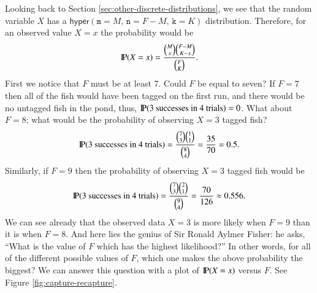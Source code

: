 \documentclass[captions=tableheading]{scrbook}
\begin{document}
\begin{example}
Looking back to Section \ref{sec:other-discrete-distributions}, we see that the random variable \(X\) has a \(\mathsf{hyper}(\mathtt{m}=M,\,\mathtt{n}=F-M,\,\mathtt{k}=K)\) distribution. Therefore, for an observed value \(X=x\) the probability would be
\[
\P(X=x)=\frac{{M \choose x}{F-M \choose K-x}}{{F \choose K}}.
\]
First we notice that \(F\) must be at least 7. Could \(F\) be equal to seven? If \(F=7\) then all of the fish would have been tagged on the first run, and there would be no untagged fish in the pond, thus, \(\P(\mbox{3 successes in 4 trials})=0\). 
What about \(F=8\); what would be the probability of observing \(X=3\) tagged fish?
\[
\P(\mbox{3 successes in 4 trials})=\frac{{7 \choose 3}{1 \choose 1}}{{8 \choose 4}}=\frac{35}{70}=0.5.
\]
Similarly, if \(F=9\) then the probability of observing \(X=3\) tagged fish would be
\[
\P(\mbox{3 successes in 4 trials})=\frac{{7 \choose 3}{2 \choose 1}}{{9 \choose 4}}=\frac{70}{126}\approx0.556.
\]
We can see already that the observed data \(X=3\) is more likely when \(F=9\) than it is when \(F=8\). And here lies the genius of Sir Ronald Aylmer Fisher: he asks, ``What is the value of \(F\) which has the highest likelihood?'' In other words, for all of the different possible values of \(F\), which one makes the above probability the biggest? We can answer this question with a plot of \(\P(X=x)\) versus \(F\). See Figure \ref{fig:capture-recapture}.
\end{example}
\end{document}
